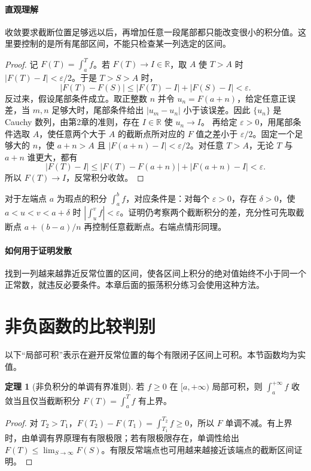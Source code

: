 \documentclass[UTF8,fontset=fandol,12pt,oneside,openany]{ctexrep}
\newcommand{\R}{\mathbb R}
\theoremstyle{definition}
\newtheorem{theorem}{定理}[chapter]
\begin{document}
\paragraph{直观理解} 收敛要求截断位置足够远以后，再增加任意一段尾部都只能改变很小的积分值。这里要控制的是所有尾部区间，不能只检查某一列选定的区间。
\begin{proof}
记 $F(T)=\int_a^T f$。若 $F(T)\to I\in\R$，取 $A$ 使 $T>A$ 时 $|F(T)-I|<\varepsilon/2$。于是 $T>S>A$ 时，
\[
 |F(T)-F(S)|\le |F(T)-I|+|F(S)-I|<\varepsilon.
\]
反过来，假设尾部条件成立。取正整数 $n$ 并令 $u_n=F(a+n)$，给定任意正误差，当 $m,n$ 足够大时，尾部条件给出 $|u_m-u_n|$ 小于该误差。因此 $\{u_n\}$ 是 Cauchy 数列，由第2章的准则，存在 $I\in\R$ 使 $u_n\to I$。
再给定 $\varepsilon>0$，用尾部条件选取 $A$，使任意两个大于 $A$ 的截断点所对应的 $F$ 值之差小于 $\varepsilon/2$。固定一个足够大的 $n$，使 $a+n>A$ 且 $|F(a+n)-I|<\varepsilon/2$。对任意 $T>A$，无论 $T$ 与 $a+n$ 谁更大，都有
\[
 |F(T)-I|\le |F(T)-F(a+n)|+|F(a+n)-I|<\varepsilon.
\]
所以 $F(T)\to I$，反常积分收敛。
\end{proof}
对于左端点 $a$ 为瑕点的积分 $\int_a^b f$，对应条件是：对每个 $\varepsilon>0$，存在 $\delta>0$，使 $a<u<v<a+\delta$ 时 $|\int_u^v f|<\varepsilon$。证明仍考察两个截断积分的差，充分性可先取截断点 $a+(b-a)/n$ 再控制任意截断点。右端点情形同理。
\paragraph{如何用于证明发散} 找到一列越来越靠近反常位置的区间，使各区间上积分的绝对值始终不小于同一个正常数，就违反必要条件。本章后面的振荡积分练习会使用这种方法。

\section{非负函数的比较判别}
\label{lec:13:comparison}
以下“局部可积”表示在避开反常位置的每个有限闭子区间上可积。本节函数均为实值。

\begin{theorem}[非负积分的单调有界准则]
若 $f\ge0$ 在 $[a,+\infty)$ 局部可积，则 $\int_a^{+\infty}f$ 收敛当且仅当截断积分 $F(T)=\int_a^T f$ 有上界。
\end{theorem}
\begin{proof}
对 $T_2>T_1$，$F(T_2)-F(T_1)=\int_{T_1}^{T_2}f\ge0$，所以 $F$ 单调不减。有上界时，由单调有界原理有有限极限；若有限极限存在，单调性给出 $F(T)\le\lim_{S\to\infty}F(S)$。有限反常端点也可用越来越接近该端点的截断区间证明。
\end{proof}
\end{document}
